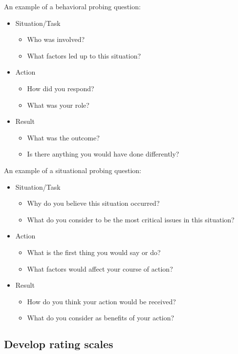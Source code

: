 \documentclass{article}
\begin{document}
An example of a behavioral probing question:
\begin{itemize}
  \item Situation/Task
    \begin{itemize}
    \item Who was involved?
    \item What factors led up to this
situation?
      \end{itemize}
  \item Action
    \begin{itemize}
    \item How did you respond?
    \item What was your role?
    \end{itemize}
  \item Result
    \begin{itemize}
    \item What was the outcome?
    \item Is there anything you would have done differently?
    \end{itemize}
\end{itemize}

An example of a situational probing question:
\begin{itemize}
  \item Situation/Task
    \begin{itemize}
    \item Why do you believe this situation occurred?
    \item What do you consider to be the most critical issues in this situation?
    \end{itemize}
  \item Action
    \begin{itemize}
    \item What is the first thing you would say or do?
    \item What factors would affect your course of action?
    \end{itemize}
  \item Result
    \begin{itemize}
    \item How do you think your action would be received?
    \item What do you consider as benefits of your action?
    \end{itemize}
\end{itemize}


\subsection{Develop rating scales}
\end{document}
